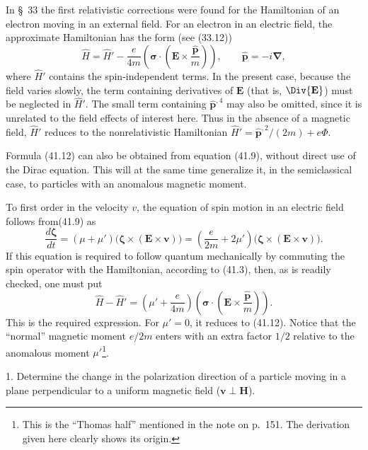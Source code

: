 In \S~33 the first relativistic corrections were found for the Hamiltonian of an electron moving in an external field. For an electron in an electric field, the approximate Hamiltonian has the form (see (33.12))
\begin{equation}
\widehat H=\widehat H'-\frac e{4m}
\left(\boldsymbol\sigma\cdot\left(\mathbf E\times\frac{\widehat{\mathbf p}}m\right)\right),
\qquad
\widehat{\mathbf p}=-i\boldsymbol\nabla,
\tag{41.12}
\end{equation}
where $\widehat H'$ contains the spin-independent terms. In the present case, because the field varies slowly, the term containing derivatives of $\mathbf E$ (that is, $\Div{\mathbf E}$) must be neglected in $\widehat H'$. The small term containing $\widehat{\mathbf p}^{,4}$ may also be omitted, since it is unrelated to the field effects of interest here. Thus in the absence of a magnetic field, $\widehat H'$ reduces to the nonrelativistic Hamiltonian $\widehat H'=\widehat{\mathbf p}^{,2}/(2m)+e\Phi$.

Formula (41.12) can also be obtained from equation (41.9), without direct use of the Dirac equation. This will at the same time generalize it, in the semiclassical case, to particles with an anomalous magnetic moment.

To first order in the velocity $v$, the equation of spin motion in an electric field follows from(41.9) as
\[
\frac{d\boldsymbol\zeta}{dt}
=(\mu+\mu')\bigl(\boldsymbol\zeta\times(\mathbf E\times\mathbf v)\bigr)
=\left(\frac e{2m}+2\mu'\right)
\bigl(\boldsymbol\zeta\times(\mathbf E\times\mathbf v)\bigr).
\]
If this equation is required to follow quantum mechanically by commuting the spin operator with the Hamiltonian, according to (41.3), then, as is readily checked, one must put
\begin{equation}
\widehat H-\widehat H'
=\left(\mu'+\frac e{4m}\right)
\left(\boldsymbol\sigma\cdot\left(\mathbf E\times\frac{\widehat{\mathbf p}}m\right)\right).
\tag{41.13}
\end{equation}
This is the required expression. For $\mu'=0$, it reduces to (41.12). Notice that the ``normal'' magnetic moment $e/2m$ enters with an extra factor $1/2$ relative to the anomalous moment $\mu'$\footnote{This is the ``Thomas half'' mentioned in the note on p.~151. The derivation given here clearly shows its origin.}.

\ProblemHeading

1. Determine the change in the polarization direction of a particle moving in a plane perpendicular to a uniform magnetic field ($\mathbf v\perp\mathbf H$).

